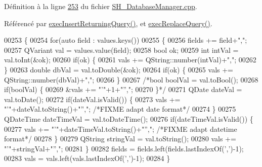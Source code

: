 Définition à la ligne \hyperlink{SH__DatabaseManager_8cpp_source_l00253}{253} du fichier \hyperlink{SH__DatabaseManager_8cpp_source}{S\-H\-\_\-\-Database\-Manager.\-cpp}.



Référencé par \hyperlink{classSimpleHotel_1_1SH__DatabaseManager_af6d035d5bd2f252bc94733bea3dfbc48}{exec\-Insert\-Returning\-Query()}, et \hyperlink{classSimpleHotel_1_1SH__DatabaseManager_a77fad7ef6701bedf21805047c986ba95}{exec\-Replace\-Query()}.


\begin{DoxyCode}
00253                                                                                              \{
00254     \textcolor{keywordflow}{for}(\textcolor{keyword}{auto} field : values.keys())
00255     \{
00256         fields += field+\textcolor{stringliteral}{","};
00257         QVariant val = values.value(field);
00258         \textcolor{keywordtype}{bool} ok;
00259         \textcolor{keywordtype}{int} intVal = val.toInt(&ok);
00260         \textcolor{keywordflow}{if}(ok) \{
00261             vals += QString::number(intVal)+\textcolor{stringliteral}{","};
00262         \}
00263         \textcolor{keywordtype}{double} dbVal = val.toDouble(&ok);
00264         \textcolor{keywordflow}{if}(ok) \{
00265             vals += QString::number(dbVal)+\textcolor{stringliteral}{","};
00266         \}
00267         \textcolor{comment}{/*bool boolVal = val.toBool();
}
00268 \textcolor{comment}{                if(boolVal) \{
}
00269 \textcolor{comment}{                    &vals += "'"+1+"'',";
}
00270 \textcolor{comment}{                \}*/}
00271         QDate dateVal = val.toDate();
00272         \textcolor{keywordflow}{if}(dateVal.isValid()) \{
00273             vals += \textcolor{stringliteral}{"'"}+dateVal.toString()+\textcolor{stringliteral}{"'',"}; \textcolor{comment}{/*FIXME adapt date format*/}
00274         \}
00275         QDateTime dateTimeVal = val.toDateTime();
00276         \textcolor{keywordflow}{if}(dateTimeVal.isValid()) \{
00277             vals += \textcolor{stringliteral}{"'"}+dateTimeVal.toString()+\textcolor{stringliteral}{"'',"}; \textcolor{comment}{/*FIXME adapt datetime format*/}
00278         \}
00279         QString stringVal = val.toString();
00280         vals += \textcolor{stringliteral}{"'"}+stringVal+\textcolor{stringliteral}{"'',"};
00281     \}
00282     fields = fields.left(fields.lastIndexOf(\textcolor{charliteral}{','})-1);
00283     vals = vals.left(vals.lastIndexOf(\textcolor{charliteral}{','})-1);
00284 \}
\end{DoxyCode}

